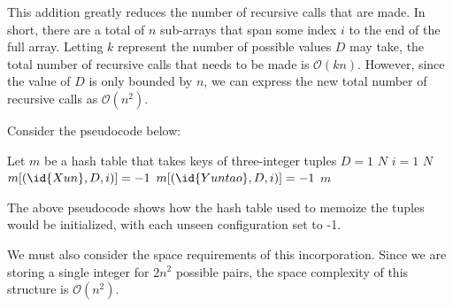     This addition greatly reduces the number of recursive calls that are made.
    In short, there are a total of $n$ sub-arrays that span some index $i$ to the end of the full array.
    Letting $k$ represent the number of possible values $D$ may take, the total number of recursive calls that needs to be made is $\mathcal{O}(kn)$.
    However, since the value of $D$ is only bounded by $n$, we can express the new total number of recursive calls as $\mathcal{O}(n^2)$.

    Consider the pseudocode below:

    \begin{spacing}{1.2}
        \begin{codebox}
        \li Let $m$ be a hash table that takes keys of three-integer tuples
        \li \For $D = 1$ \To $N$
        \Do
            \li \For $i = 1$ \To $N$
            \Do
                \li $m[(\id{Xun}, D, i)] = -1$
                \li $m[(\id{Yuntao}, D, i)] = -1$
            \End
        \End
        \li \Return $m$
        \end{codebox}
    \end{spacing}
    \vspace{5mm}

    The above pseudocode shows how the hash table used to memoize the tuples would be initialized, with each unseen configuration set to -1.
    
    We must also consider the space requirements of this incorporation. Since we are storing a single integer for $2n^2$ possible pairs, the space complexity of this structure is $\mathcal{O}(n^2)$. \\

    

